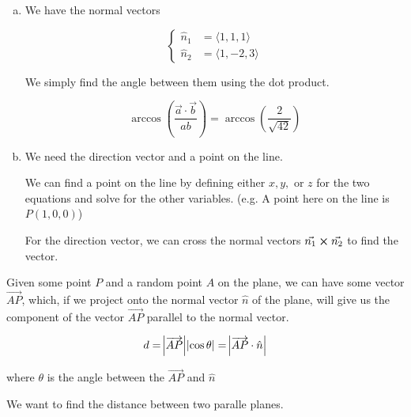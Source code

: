 \begin{sol}
	\begin{enumerate}[a)]
		\item We have the normal vectors

		\begin{equation}
			\begin{cases}
				\hat n_1 &= \langle 1, 1, 1 \rangle\\
				\hat n_2 &= \langle 1, -2, 3 \rangle
			\end{cases}
		\end{equation}

		We simply find the angle between them using the dot product.

		\begin{equation}
			\arccos\left(\frac{\vec a \cdot \vec b}{ab}\right) = \arccos\left(\frac{2}{\sqrt{42}}\right)
		\end{equation}

		\item We need the direction vector and a point on the line.
		
		We can find a point on the line by defining either $x, y,$ or $z$ for the two equations and solve for the other variables. (e.g. A point here on the line is $P(1,0,0)$)

		For the direction vector, we can cross the normal vectors $\vec{n_1} \cross \vec{n_2}$ to find the vector.
	\end{enumerate}
\end{sol}

\begin{definition}
	Given some point $P$ and a random point $A$ on the plane, we can have some vector $\overrightarrow{AP}$, which, if we project onto the normal vector $\hat n$ of the plane, will give us the component of the vector $\overrightarrow{AP}$ parallel to the normal vector.

	\begin{equation}
		d = \abs{\overrightarrow{AP}} \abs{\cos\theta} = \abs{\overrightarrow{AP} \cdot \hat n}
	\end{equation}

	where $\theta$ is the angle between the $\overrightarrow{AP}$ and $\hat n$
\end{definition}

\begin{example}
	We want to find the distance between two paralle planes.
\end{example}


